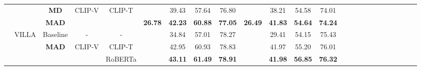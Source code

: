 \documentclass[runningheads]{llncs}
\begin{document}
\begin{table*}[]
\begin{center}
{\begin{tabular}{|c|c|c|cc|cccc|cccc|lllllllllll}
                                                                                   &                                                                         & \textbf{MD}                   & \multicolumn{1}{c|}{\multirow{2}{*}{CLIP-V}} & \multirow{2}{*}{CLIP-T} &                      & 39.43                        & 57.64                         & 76.80                 &                      & 38.21                        & 54.58                         & 74.01                 &  &  &  &  &  &  &  &  &  &  &  \\ \cline{3-3}
                                                                                   &                                                                         & \textbf{MAD}                  & \multicolumn{1}{c|}{}                        &                         & \textbf{26.78}       & \textbf{42.23}               & \textbf{60.88}                & \textbf{77.05}        & \textbf{26.49}       & \textbf{41.83}               & \textbf{54.64}                & \textbf{74.24}        &  &  &  &  &  &  &  &  &  &  &  \\ \cline{2-13}
                                                                                   & \multirow{4}{*}{VILLA}                                                  & Baseline                             & \multicolumn{1}{c|}{-}                       & -                       &                      & 34.84                        & 57.01                         & 78.27                 &                      & 29.41                        & 54.15                         & 75.43                 &  &  &  &  &  &  &  &  &  &  &  \\ \cline{3-5}
                                                                                   &                                                                         & \multirow{3}{*}{\textbf{MAD}} & \multicolumn{1}{c|}{\multirow{2}{*}{CLIP-V}} & CLIP-T                  &                      & 42.95                        & 60.93                         & 78.83                 &                      & 41.97                        & 55.20                         & 76.01                 &  &  &  &  &  &  &  &  &  &  &  \\ \cline{5-5}
                                                                                   &                                                                         &                                      & \multicolumn{1}{c|}{}                        & RoBERTa                 &                      & \textbf{43.11}               & \textbf{61.49}                & \textbf{78.91}        & \textbf{}            & \textbf{41.98}               & \textbf{56.85}                & \textbf{76.32}        &  &  &  &  &  &  &  &  &  &  &  \\ \cline{4-5}

\end{tabular}}
\end{center}
\end{table*}
\end{document}
